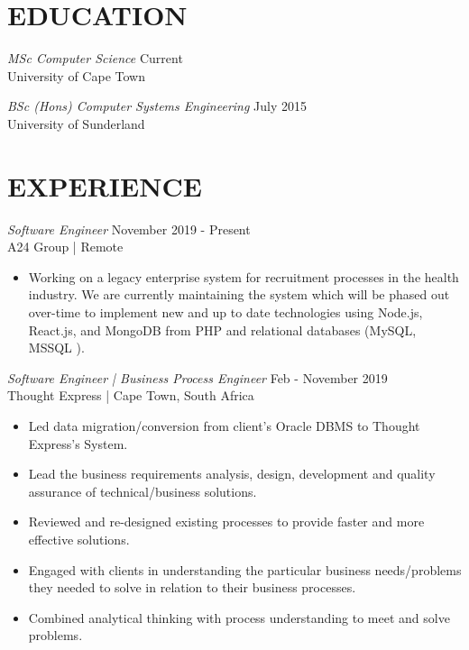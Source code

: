 \documentclass[margin, 10pt]{res}
\begin{document}
\begin{resume}
\section{EDUCATION}


{\sl MSc Computer Science } \hfill Current \\
University of Cape Town

{\sl BSc (Hons) Computer Systems Engineering } \hfill July 2015 \\
University of Sunderland


  
 
\section{EXPERIENCE}

{\sl Software Engineer} \hfill November 2019 - Present \\
A24 Group | Remote
\begin{itemize}
\item Working on a legacy enterprise system for recruitment processes in the health industry. We are currently maintaining the
system which will be phased out over-time  to implement new and up to date
technologies using Node.js, React.js, and MongoDB from PHP and relational
databases (MySQL, MSSQL ).
\end{itemize} 

{\sl Software Engineer | Business Process Engineer} \hfill Feb - November 2019 \\
Thought Express | Cape Town, South Africa
\begin{itemize}
\item Led data migration/conversion from client's Oracle
DBMS to Thought Express's System.
\item Lead the business requirements analysis, design, development and
quality assurance of technical/business solutions.

\item Reviewed and re-designed existing processes to provide faster and
more effective solutions.

\item Engaged with clients in understanding the particular business needs/problems they needed to solve in relation to their business processes.

\item Combined analytical thinking with process understanding to meet and
solve problems.


\end{itemize}
\end{resume}
\end{document}
